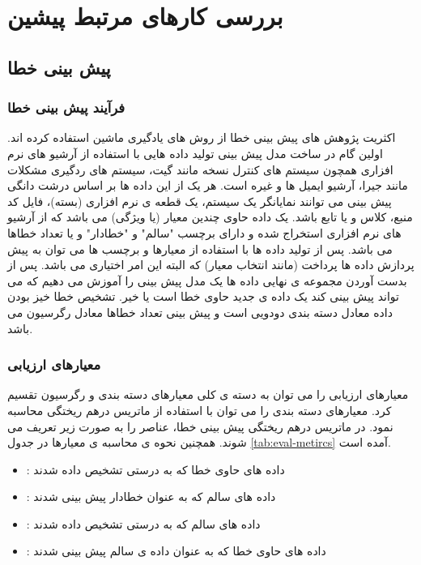 \section{بررسی کارهای مرتبط پیشین}
\label{sec:survey}

\subsection{پیش بینی خطا}
\subsubsection{فرآیند پیش بینی خطا}
اکثریت پژوهش های پیش بینی خطا از روش های یادگیری ماشین  استفاده کرده اند. اولین گام در ساخت مدل پیش بینی تولید داده هایی با استفاده از آرشیو های نرم افزاری همچون سیستم های کنترل نسخه مانند گیت، سیستم های ردگیری مشکلات  مانند جیرا،  آرشیو ایمیل ها و غیره است. هر یک از این داده ها بر اساس درشت دانگی پیش بینی می توانند نمایانگر یک سیستم، یک قطعه ی نرم افزاری (بسته)، فایل کد منبع، کلاس و یا تابع باشد. یک داده حاوی چندین معیار (یا ویژگی) می باشد که از آرشیو های نرم افزاری استخراج شده و دارای برچسب "سالم" و "خطادار"  و یا تعداد خطاها می باشد. پس از تولید داده ها با استفاده از معیارها و برچسب ها می توان به پیش پردازش داده ها پرداخت (مانند انتخاب معیار) که البته این امر اختیاری می باشد. پس از بدست آوردن مجموعه ی نهایی داده ها یک مدل پیش بینی را آموزش می دهیم که می تواند پیش بینی کند یک داده ی جدید حاوی خطا است یا خیر. تشخیص خطا خیز بودن داده معادل دسته بندی دودویی است و پیش بینی تعداد خطاها معادل رگرسیون می باشد. 
\subsubsection{معیارهای ارزیابی}
معیارهای ارزیابی را می توان به دسته ی کلی  معیارهای دسته بندی و رگرسیون تقسیم کرد.  معیارهای دسته بندی را می توان با استفاده از ماتریس درهم ریختگی محاسبه نمود. در ماتریس درهم ریختگی پیش بینی خطا، عناصر را به صورت زیر تعریف می شوند.  همچنین نحوه ی محاسبه ی معیارها در جدول \ref{tab:eval-metircs} آمده است. 
\begin{itemize}
	\setlength\itemsep{.01em}
\item {} : 
داده های حاوی خطا که به درستی تشخیص داده شدند
\item {}: 
  داده های سالم که به عنوان خطادار پیش بینی شدند
\item {}:
داده های سالم که به درستی تشخیص داده شدند
\item {}: 
داده های حاوی خطا که به عنوان داده ی سالم پیش بینی شدند

\end{itemize}


